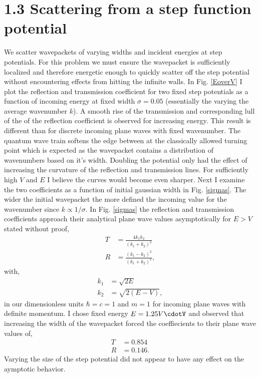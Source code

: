 \documentclass[singlepage,notitlepage,nofootinbib,11pt]{revtex4-1}
\begin{document}
\section*{1.3 Scattering from a step function potential}
We scatter wavepackets of varying widths and incident energies at step potentials. For this problem we must ensure the wavepacket is sufficiently localized and therefore energetic enough to quickly scatter off the step potential without encountering effects from hitting the infinite walls. In Fig. \ref{EoverV} I plot the reflection and transmission coefficient for two fixed step potentials as a function of incoming energy at fixed width $\sigma=0.05$ (essentially the varying the average wavenumber $k$). A smooth rise of the transmission and corresponding lull of the of the reflection coefficient is observed for increasing energy. This result is different than for discrete incoming plane waves with fixed wavenumber. The quantum wave train softens the edge between at the classically allowed turning point which is expected as the wavepacket contains a distribution of wavenumbers based on it's width. Doubling the potential only had the effect of increasing the curvature of the reflection and transmission lines. For sufficiently high $V$ and $E$ I believe the curves would become even sharper. Next I examine the two coefficients as a function of initial gaussian width in Fig. \ref{sigmas}. The wider the initial wavepacket the more defined the incoming value for the wavenumber since $k\propto 1/\sigma$. In Fig. \ref{sigmas} the reflection and transmission coefficients approach their analytical plane wave values asymptotically for $E>V$ stated without proof,
\begin{align*}
T &= \frac{4 k_1 k_2 }{(k_1 + k_2)^2}\\
R &= \frac{(k_1 - k_2)^2}{(k_1+k_2)^2},
\end{align*}
with,
\begin{align*}
k_1 &= \sqrt{2E}\\
k_2 &= \sqrt{2(E-V)},
\end{align*}
in our dimensionless units $\hbar=c=1$ and $m=1$ for incoming plane waves with definite momentum. I chose fixed energy $E=1.25V\cdotV$ and observed that increasing the width of the wavepacket forced the coeffiecients to their plane wave values of,
\begin{align*}
T&=0.854\\
R&=0.146.
\end{align*}
Varying the size of the step potential did not appear to have any effect on the aymptotic behavior.
\end{document}
